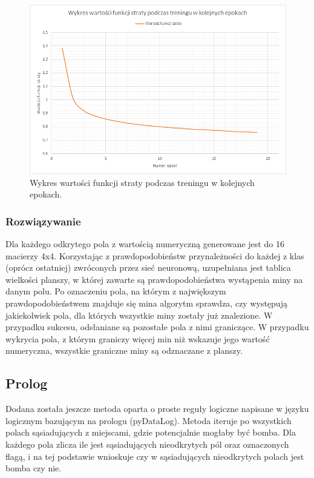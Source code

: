 \documentclass[letterpaper,12pt]{article}
\begin{document}
\begin{figure}[H]
    \centering
    \includegraphics[scale=0.6]{funkcjastraty.png}
    \caption{Wykres wartości funkcji straty podczas treningu w kolejnych epokach.}
\end{figure} 
\subsubsection*{Rozwiązywanie}
Dla każdego odkrytego pola z wartością numeryczną generowane jest do 16 macierzy 4x4. Korzystając z prawdopodobieństw przynależności do każdej z klas (oprócz ostatniej) zwróconych przez sieć neuronową, uzupełniana jest tablica wielkości planszy,
w której zawarte są prawdopodobieństwa wystąpenia miny na danym polu. Po oznaczeniu pola, na którym z największym prawdopodobieństwem znajduje się mina algorytm sprawdza, czy występują jakiekolwiek pola, dla których wszystkie miny zostały już znalezione. W przypadku sukcesu, 
odsłaniane są pozostałe pola z nimi graniczące. W przypadku wykrycia pola, z którym graniczy więcej min niż wskazuje jego wartość numeryczna, wszystkie graniczne miny są odznaczane z planszy. 
\subsection{Prolog}
Dodana została jeszcze metoda oparta o proste reguły logiczne napisane w języku logicznym bazującym na prologu (pyDataLog).
Metoda iteruje po wszystkich polach sąsiadujących z miejscami, gdzie potencjalnie mogłaby być bomba.
Dla każdego pola zlicza ile jest sąsiadujących nieodkrytych pól oraz oznaczonych flagą, i na tej podstawie wnioskuje czy w sąsiadujących nieodkrytych polach jest bomba czy nie.
\end{document}
